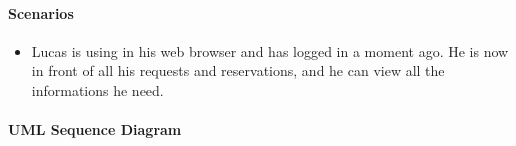 \paragraph{Scenarios}
\begin{itemize}
	\item Lucas is using \myTaxiService{} in his web browser and has logged in a moment ago.
	He is now in front of all his requests and reservations, and he can view all the informations he need.
\end{itemize}
\paragraph{UML Sequence Diagram}

